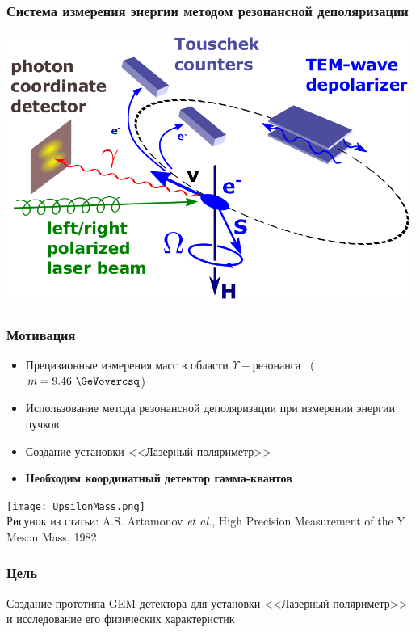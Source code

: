 \documentclass[14pt]{beamer}
\begin{document}
\begin{frame}
\frametitle{\large{Система измерения энергии методом резонансной деполяризации}}
	\begin{center}
		\includegraphics[width=0.8\linewidth]{mrd-touschek-lsrp.png}\\
	\end{center}
\end{frame}

\begin{frame}
	\frametitle{Мотивация}
	\begin{minipage}[h]{0.55\linewidth}
	\small{
	\begin{itemize}
		\item Прецизионные измерения масс в области $\Upsilon-\text{резонанса}$
		~($m = 9.46~\GeVovercsq$) 
		\item Использование метода резонансной деполяризации при измерении энергии пучков
		\item Создание установки <<Лазерный поляриметр>>
		\item \textbf{Необходим координатный детектор гамма-квантов}
	\end{itemize}}
	\hfill
	\end{minipage}
		\begin{minipage}[h]{0.43\linewidth}
			\texttt{[image: UpsilonMass.png]}
			\\\tiny{Рисунок из статьи: A.S. Artamonov \emph{et al.}, High Precision Measurement of the Y Meson Mass, 1982}
		\end{minipage}
	\end{frame}

\begin{frame}
\frametitle{Цель}
Создание прототипа GEM-детектора для установки <<Лазерный поляриметр>> и исследование его физических характеристик
\end{frame}
\end{document}
